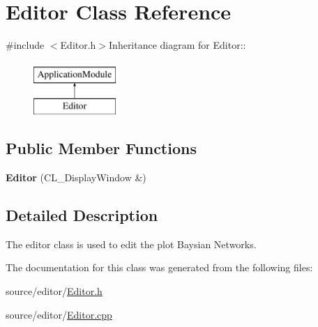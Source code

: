 \hypertarget{classEditor}{
\section{Editor Class Reference}
\label{classEditor}
}


{\ttfamily \#include $<$Editor.h$>$}Inheritance diagram for Editor::\begin{figure}[H]
\begin{center}
\leavevmode
\includegraphics[height=2cm]{classEditor}
\end{center}
\end{figure}
\subsection*{Public Member Functions}
\begin{DoxyCompactItemize}
\item 
\hypertarget{classEditor_aa27188c2a247b99fb7a5a00229be9a6b}{
{\bfseries Editor} (CL\_\-DisplayWindow \&)}
\label{classEditor_aa27188c2a247b99fb7a5a00229be9a6b}

\end{DoxyCompactItemize}


\subsection{Detailed Description}
The editor class is used to edit the plot Baysian Networks. 

The documentation for this class was generated from the following files:\begin{DoxyCompactItemize}
\item 
source/editor/\hyperlink{Editor_8h}{Editor.h}\item 
source/editor/\hyperlink{Editor_8cpp}{Editor.cpp}\end{DoxyCompactItemize}
